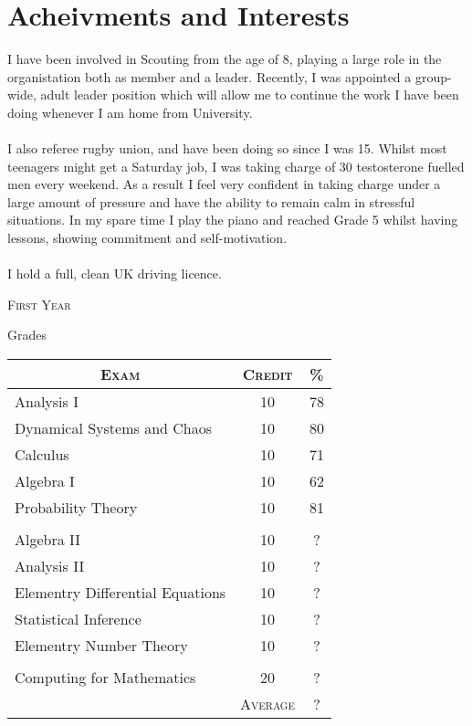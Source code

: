 \documentclass[a4paper, 11pt]{article}
\begin{document}
\section{Acheivments and Interests}
I have been involved in Scouting from the age of 8, playing a large role in the organistation both as member and a leader. Recently, I was appointed a group-wide, adult leader position which will allow me to continue the work I have been doing whenever I am home from University. \\
\\
I also referee rugby union, and have been doing so since I was 15. Whilst most teenagers might get a Saturday job, I was taking charge of 30 testosterone fuelled men every weekend. As a result I feel very confident in taking charge under a large amount of pressure and have the ability to remain calm in stressful situations. In my spare time I play the piano and reached Grade 5 whilst having lessons, showing commitment and self-motivation. \\
\\
I hold a full, clean UK driving licence.

\bigskip
\par{\centering\Large {\textsc{First Year}}
\par}\large{\centering Grades\par}\normalsize

\begin{center}
\begin{tabular}{lcc}

\multicolumn{1}{c}{\textsc{Exam}} & \textsc{Credit}&\textsc{\%}\\ \hline
Analysis I & 10 & 78\\
Dynamical Systems and Chaos & 10 & 80\\
Calculus & 10 & 71\\
Algebra I & 10 & 62\\
Probability Theory & 10 & 81\\
\\
Algebra II & 10 & ?\\
Analysis II & 10 & ?\\
Elementry Differential Equations & 10 & ?\\
Statistical Inference & 10 & ?\\
Elementry Number Theory & 10 & ?\\
\\
Computing for Mathematics & 20 & ?\\
\cline{2-3}
&\textsc{Average}&?

\end{tabular}
\end{center}
\bigskip
\end{document}
